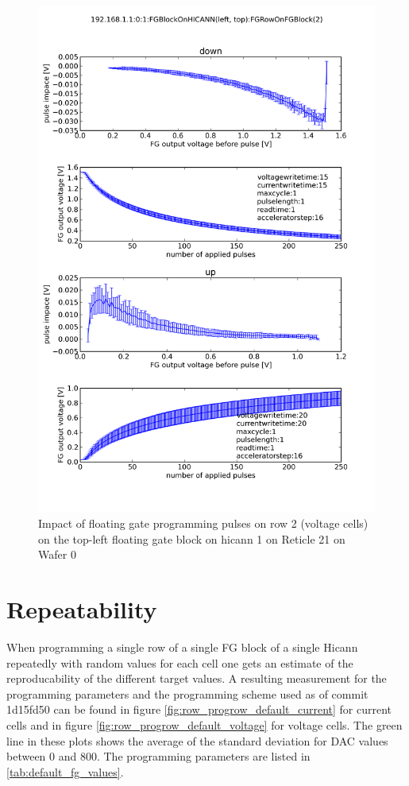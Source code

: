 \documentclass[a4paper,twocolumn,draft=true]{scrartcl}
\begin{document}
\begin{figure}
\includegraphics[scale=.35]{figures/pulse_characterization_voltage_15_20.png}
\caption{Impact of floating gate programming pulses on row 2 (voltage cells) on the top-left floating gate block on hicann 1 on Reticle 21 on Wafer 0}
\label{fig:pulse_characterization_voltage_15_20}
\end{figure}

\section{Repeatability}
When programming a single row of a single FG block of a single Hicann repeatedly with random values for each cell one gets an estimate of the reproducability of the different target values.
A resulting measurement for the programming parameters and the programming scheme used as of commit 1d15fd50 can be found in figure \ref{fig:row_progrow_default_current} for current cells and in figure \ref{fig:row_progrow_default_voltage} for voltage cells.
The green line in these plots shows the average of the standard deviation for DAC values between 0 and 800.
The programming parameters are listed in \ref{tab:default_fg_values}.
\end{document}
